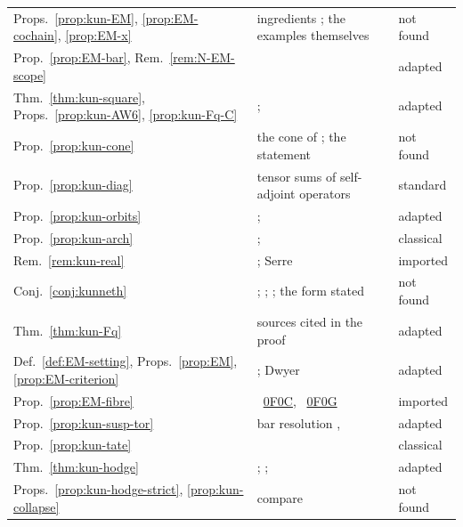 \documentclass[11pt]{amsart}
\theoremstyle{plain}
\theoremstyle{definition}
\theoremstyle{remark}
\numberwithin{equation}{section}
\newcommand{\stackstag}[1]{\cite[Tag~#1]{StacksProject}\,%
  \href{https://stacks.math.columbia.edu/tag/#1}{\textsf{#1}}}
\begin{document}
{\begin{longtable}{@{}>{\raggedright\arraybackslash}p{}
>{\raggedright\arraybackslash}p{}
>{\raggedright\arraybackslash}p{}@{}}
Props.~\ref{prop:kun-EM}, \ref{prop:EM-cochain}, \ref{prop:EM-x} &
ingredients \cite[pp.~22--23, 89--90, 105]{MilneLEC2013}; the examples
themselves & not found\\
Prop.~\ref{prop:EM-bar}, Rem.~\ref{rem:N-EM-scope} &
\cite[Theorem~7.6, p.~241]{McCleary2001UsersGuide} & adapted\\
Thm.~\ref{thm:kun-square}, Props.~\ref{prop:kun-AW6},
\ref{prop:kun-Fq-C} & \cite[p.~132]{Manin1995Lectures};
\cite[(7.32), p.~42]{Deninger1994Motivic} & adapted\\
Prop.~\ref{prop:kun-cone} & the cone of
\cite[p.~219]{Kurokawa1992MultipleZeta}; the statement & not found\\
Prop.~\ref{prop:kun-diag} & tensor sums of self-adjoint operators &
standard\\
Prop.~\ref{prop:kun-orbits} & \cite[pp.~167--168, p.~181]%
{Deninger1998Analogies}; \cite[p.~220]{Kurokawa1992MultipleZeta} &
adapted\\
Prop.~\ref{prop:kun-arch} & \cite[\S3, (25)]{Serre1970Facteurs};
\cite[VII.12, p.~535]{Neukirch1999ANT} & classical\\
Rem.~\ref{rem:kun-real} & \cite[p.~184]{Deninger1998Analogies}; Serre
\cite[fn.~25, p.~27]{Milne2016RHFF} & imported\\
Conj.~\ref{conj:kunneth} & \cite[(7.32)]{Deninger1994Motivic};
\cite[\S3]{ConnesConsani2018RiemannRoch};
\cite[\S6]{Scholze2018PadicGeometry}; the form stated & not found\\
Thm.~\ref{thm:kun-Fq} & sources cited in the proof & adapted\\
Def.~\ref{def:EM-setting}, Props.~\ref{prop:EM},
\ref{prop:EM-criterion} & \cite[Definition~1.1.7, Proposition~1.1.9,
Corollary~1.1.10]{Lurie2011DAGXIII}; Dwyer & adapted\\
Prop.~\ref{prop:EM-fibre} & \stackstag{0F0C}, \stackstag{0F0G} &
imported\\
Prop.~\ref{prop:kun-susp-tor} & bar resolution
\cite[X.2, Theorem~2.1]{MacLane1963Homology},
\cite[8.6.12]{Weibel1994Homological} & adapted\\
Prop.~\ref{prop:kun-tate} & \cite[Proposition~2.2.3]{Kahn2018Fonctions}
& classical\\
Thm.~\ref{thm:kun-hodge} & \cite[3.11]{Kleiman1968Cycles};
\cite[\S21, Theorem~1]{Mumford1974AV};
\cite[Th\'eor\`eme~2]{Serre1960Analogues} & adapted\\
Props.~\ref{prop:kun-hodge-strict}, \ref{prop:kun-collapse} &
compare \cite[pp.~4--5]{Deninger2010HilbertPolya} & not found\\

\end{longtable}}
\end{document}
